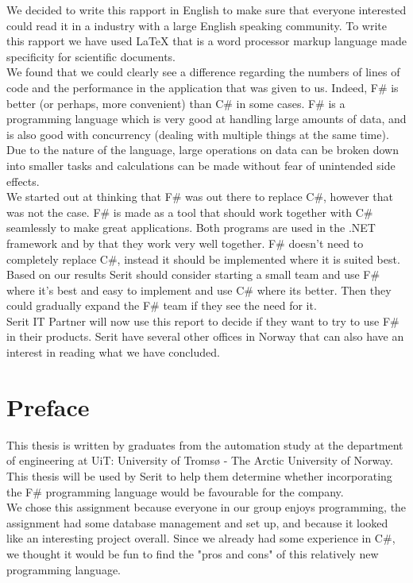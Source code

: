 \documentclass[12pt, a4paper]{article}
\begin{document}
We decided to write this rapport in English to make sure that everyone interested could read it in a industry with a large English speaking community. To write this rapport we have used LaTeX that is a word processor markup language made specificity for scientific documents.\\

We found that we could clearly see a difference regarding the numbers of lines of code and the performance in the application that was given to us. Indeed, F\# is better (or perhaps, more convenient) than C\# in some cases. F\# is a programming language which is very good at handling large amounts of data, and is also good with concurrency (dealing with multiple things at the same time). Due to the nature of the language, large operations on data can be broken down into smaller tasks and calculations can be made without fear of unintended side effects.\\

We started out at thinking that F\# was out there to replace C\#, however that was not the case. F\# is made as a tool that should work together with C\# seamlessly to make great applications. Both programs are used in the .NET framework and by that they work very well together. F\# doesn't need to completely replace C\#, instead it should be implemented where it is suited best. Based on our results Serit should consider starting a small team and use F\# where it's best and easy to implement and use C\# where its better. Then they could gradually expand the F\# team if they see the need for it.\\

Serit IT Partner will now use this report to decide if they want to try to use F\# in their products. Serit have several other offices in Norway that can also have an interest in reading what we have concluded.

\newpage
\section*{Preface}
This thesis is written by graduates from the automation study at the department of engineering  at UiT: University of Tromsø - The Arctic University of Norway. This thesis will be used by Serit to help them determine whether incorporating the F\# programming language would be favourable for the company.\\

We chose this assignment because everyone in our group enjoys programming, the assignment had some database management and set up, and because it looked like an interesting project overall. Since we already had some experience in C\#, we thought it would be fun to find the "pros and cons" of this relatively new programming language.\\
\end{document}
